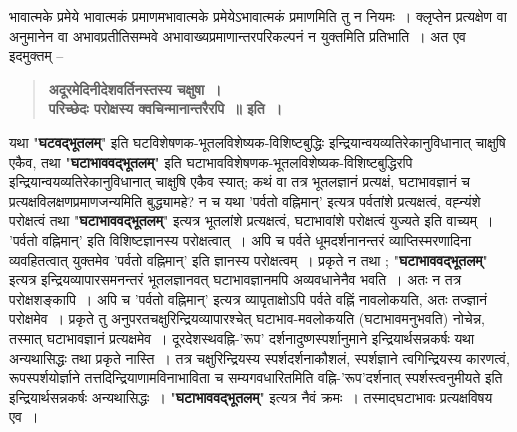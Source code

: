 {भावात्मके प्रमेये भावात्मकं प्रमाणमभावात्मके प्रमेयेऽभावात्मकं प्रमाणमिति तु न नियमः~। क्लृप्तेन प्रत्यक्षेण वा अनुमानेन वा अभावप्रतीतिसम्भवे अभावाख्यप्रमाणान्तरपरिकल्पनं न युक्तमिति प्रतिभाति~। अत एव इदमुक्तम् –
\begin{verse}
\textbf{अदूरमेदिनीदेशवर्तिनस्तस्य चक्षुषा~। \\
परिच्छेदः परोक्षस्य क्वचिन्मानान्तरैरपि~॥ इति~। }
\end{verse}
यथा "\textbf{घटवद्भूतलम्}" इति घटविशेषणक-भूतलविशेष्यक-विशिष्टबुद्धिः इन्द्रियान्वयव्यतिरेकानुविधानात् चाक्षुषि एकैव, तथा "\textbf{घटाभाववद्भूतलम्}" इति घटाभावविशेषणक-भूतल\-विशेष्यक-विशिष्टबुद्धिरपि इन्द्रियान्वयव्यतिरेकानुविधानात् चाक्षुषि एकैव स्यात्; कथं वा तत्र भूतलज्ञानं प्रत्यक्षं, घटाभावज्ञानं च प्रत्यक्षविलक्षणप्रमाणजन्यमिति बुद्ध्यामहे? न च यथा 'पर्वतो वह्निमान्' इत्यत्र पर्वतांशे प्रत्यक्षत्वं, वह्न्यंशे परोक्षत्वं तथा "\textbf{घटाभाववद्भू\-तलम्}" इत्यत्र भूतलांशे प्रत्यक्षत्वं, घटाभावांशे परोक्षत्वं युज्यते इति वाच्यम्~। 'पर्वतो वह्निमान्' इति विशिष्टज्ञानस्य परोक्षत्वात्~। अपि च पर्वते धूमदर्शनानन्तरं व्याप्तिस्मरणादिना व्यवहितत्वात् युक्तमेव 'पर्वतो वह्निमान्' इति ज्ञानस्य परोक्षत्वम्~। प्रकृते न तथा ; "\textbf{घटाभाववद्भूतलम्}" इत्यत्र इन्द्रियव्यापारसमनन्तरं भूतलज्ञानवत् घटाभावज्ञानमपि अव्यवधानेनैव भवति~। अतः न तत्र परोक्षशङ्कापि~। अपि च 'पर्वतो वह्निमान्' इत्यत्र व्यापृताक्षोऽपि पर्वते वह्निं नावलोकयति, अतः तज्ज्ञानं परोक्षमेव~। प्रकृते तु अनुपरतचक्षुरिन्द्रियव्यापारश्चेत् घटाभाव-मवलोकयति (घटाभावमनुभवति) नोचेन्न, तस्मात् घटाभावज्ञानं प्रत्यक्षमेव~। दूरदेशस्थवह्नि-'रूप' दर्शनादुष्णस्पर्शानुमाने इन्द्रियार्थसन्नकर्षः यथा अन्यथासिद्धः तथा प्रकृते नास्ति~। तत्र चक्षुरिन्द्रियस्य स्पर्शदर्शनाकौशलं, स्पर्शज्ञाने त्वगिन्द्रियस्य कारणत्वं, रूपस्पर्शयोर्ज्ञाने तत्तदिन्द्रियाणामविनाभाविता च सम्यगवधारितमिति वह्नि-'रूप'दर्शनात् स्पर्शस्त्वनुमीयते इति इन्द्रियार्थसन्नकर्षः अन्यथासिद्धः~। "\textbf{घटाभाववद्भू\-तलम्}" इत्यत्र नैवं क्रमः~। तस्माद्घटाभावः प्रत्यक्षविषय एव~। 

}
